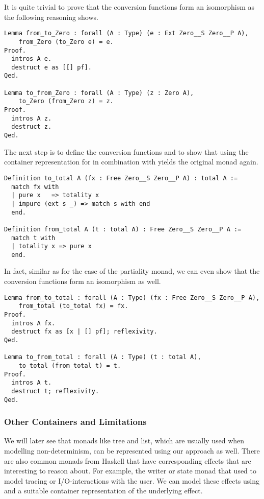 It is quite trivial to prove that the conversion functions form an isomorphism as the following reasoning shows.

\begin{verbatim}
Lemma from_to_Zero : forall (A : Type) (e : Ext Zero__S Zero__P A),
    from_Zero (to_Zero e) = e.
Proof.
  intros A e.
  destruct e as [[] pf].
Qed.

Lemma to_from_Zero : forall (A : Type) (z : Zero A),
    to_Zero (from_Zero z) = z.
Proof.
  intros A z.
  destruct z.
Qed.
\end{verbatim}

The next step is to define the conversion functions  and  to show that using the container representation for  in combination with  yields the original monad  again.

\begin{verbatim}
Definition to_total A (fx : Free Zero__S Zero__P A) : total A :=
  match fx with
  | pure x   => totality x
  | impure (ext s _) => match s with end
  end.

Definition from_total A (t : total A) : Free Zero__S Zero__P A :=
  match t with
  | totality x => pure x
  end.
\end{verbatim}

\noindent
In fact, similar as for the case of the partiality monad, we can even show that the conversion functions form an isomorphism as well.

\begin{verbatim}
Lemma from_to_total : forall (A : Type) (fx : Free Zero__S Zero__P A),
    from_total (to_total fx) = fx.
Proof.
  intros A fx.
  destruct fx as [x | [] pf]; reflexivity.
Qed.

Lemma to_from_total : forall (A : Type) (t : total A),
    to_total (from_total t) = t.
Proof.
  intros A t.
  destruct t; reflexivity.
Qed.
\end{verbatim}

\subsubsection{Other Containers and Limitations}

We will later see that monads like tree and list, which are usually used when modelling non-determinism, can be represented using our approach as well.
There are also common monads from Haskell that have corresponding effects that are interesting to reason about.
For example, the writer or state monad that used to model tracing or I/O-interactions with the user.
We can model these effects using  and a suitable container representation of the underlying effect.

